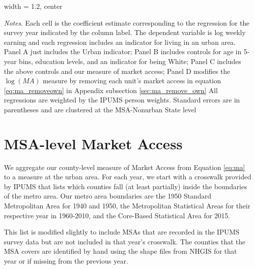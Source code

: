 \documentclass[12pt,twoside]{article}
\begin{document}
\begin{landscape}
\begin{table}[htb]
\begin{adjustbox}{width = 1.2\textwidth, center}
\begin{threeparttable}
        \begin{tablenotes}[flushleft]
            \item \textit{Notes.} Each cell is the coefficient estimate corresponding to the regression for the survey year indicated by the column label. The dependent variable is log weekly earning and each regression includes an indicator for living in an urban area. Panel A just includes the Urban indicator; Panel B includes controls for age in 5-year bins, education levels, and an indicator for being White; Panel C includes the above controls and our measure of market access; Panel D modifies the $\log(MA)$ measure by removing each unit's market access in equation \ref{eq:ma_removeown} in Appendix subsection \ref{sec:ma_remove_own} All regressions are weighted by the IPUMS person weights. Standard errors are in parentheses and are clustered at the MSA-Nonurban State level 
        \end{tablenotes}
    \end{threeparttable}
    \end{adjustbox}
\end{table}
    
\end{landscape}



\section{MSA-level Market Access}\label{appendix:msa_ma}
\setcounter{table}{0}
\setcounter{figure}{0}

We aggregate our county-level measure of Market Access from Equation \ref{eq:ma} to a measure at the urban area. For each year, we start with a crosswalk provided by IPUMS that lists which counties fall (at least partially) inside the boundaries of the metro area. Our metro area boundaries are the 1950 Standard Metropolitan Area for 1940 and 1950, the Metropolitan Statistical Areas for their respective year in 1960-2010, and the Core-Based Statistical Area for 2015. 

This list is modified slightly to include MSAs that are recorded in the IPUMS survey data but are not included in that year's crosswalk. The counties that the MSA covers are identified by hand using the shape files from NHGIS for that year or if missing from the previous year. 
\end{document}
